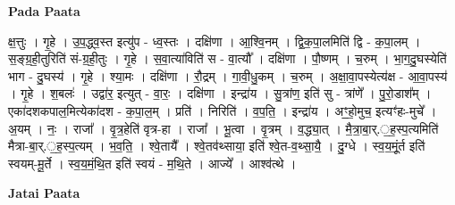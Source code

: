 \documentclass[17pt]{extarticle}
\begin{document}
\textbf{Pada Paata} \newline

क्ष॒त्तुः । गृ॒हे । उ॒प॒द्ध्व॒स्त इत्यु॑प - ध्व॒स्तः । दक्षि॑णा । आ॒श्वि॒नम् । द्वि॒क॒पा॒लमिति॑ द्वि - क॒पा॒लम् । स॒ङ्ग्र॒ही॒तुरिति॑ सं-ग्र॒ही॒तुः । गृ॒हे । स॒वा॒त्या॑विति॑ स - वा॒त्यौ᳚ । दक्षि॑णा । पौ॒ष्णम् । च॒रुम् । भा॒ग॒दु॒घस्येति॑ भाग - दु॒घस्य॑ । गृ॒हे । श्या॒मः । दक्षि॑णा । रौ॒द्रम् । गा॒वी॒धु॒कम् । च॒रुम् । अ॒क्षा॒वा॒पस्येत्य॑क्ष - आ॒वा॒पस्य॑ । गृ॒हे । श॒बलः॑ । उद्वा॑र॒ इत्युत् - वा॒रः॒ । दक्षि॑णा । इन्द्रा॑य । सु॒त्रांण॒ इति॑ सु - त्रांणे᳚ । पु॒रो॒डाश᳚म् । एका॑दशकपाल॒मित्येका॑दश - क॒पा॒ल॒म् । प्रति॑ । निरिति॑ । व॒प॒ति॒ । इन्द्रा॑य । अꣳ॒॒हो॒मुच॒ इत्यꣳ॑हः-मुचे᳚ । अ॒यम् । नः॒ । राजा᳚ । वृ॒त्र॒हेति॑ वृत्र-हा । राजा᳚ । भू॒त्वा । वृ॒त्रम् । व॒द्ध्या॒त् । मै॒त्रा॒बा॒र्.॒ह॒स्प॒त्यमिति॑ मैत्रा-बा॒र्.॒ह॒स्प॒त्यम् । भ॒व॒ति॒ । श्वे॒तायै᳚ । श्वे॒तव॑थ्साया॒ इति॑ श्वे॒त-व॒थ्सा॒यै॒ । दु॒ग्धे । स्व॒य॒मूं॒र्त इति॑ स्वयम्-मू॒र्ते । स्व॒य॒मं॒थि॒त इति॑ स्वयं - म॒थि॒ते । आज्ये᳚ । आश्व॑त्थे ।  \newline



\textbf{Jatai Paata} \newline
\end{document}
